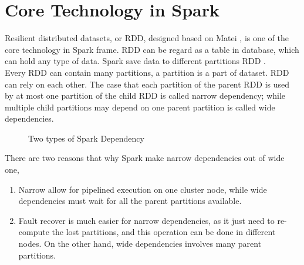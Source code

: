 \clearpage
\section{Core Technology in Spark}
Resilient distributed datasets, or RDD, designed based on Matei \cite{zaharia2012resilient}, is one of the core technology in Spark frame. RDD can be regard as a table in database, which can hold any type of data. Spark save data to different partitions RDD \cite{ryza2015advanced}.\\


Every RDD can contain many partitions, a partition is a part of dataset. RDD can rely on each other. The case that each partition of the parent RDD is used by at most one partition of the child RDD is called narrow dependency; while multiple child partitions may depend on one parent partition is called wide dependencies\cite{ryza2015advanced}.
\begin{figure}[h]
	\centering
	\caption{Two types of Spark Dependency\cite{zaharia2016architecture}}
\end{figure} 
\clearpage

There are two reasons that why Spark make narrow dependencies out of wide one\cite{zaharia2016architecture},
\begin{enumerate}
	\item Narrow allow for pipelined execution on one cluster node, while wide dependencies must wait for all the parent partitions available.
	\item Fault recover is much easier for narrow dependencies, as it just need to re-compute the lost partitions, and this operation can be done in different nodes. On the other hand, wide dependencies involves many parent partitions.
\end{enumerate}